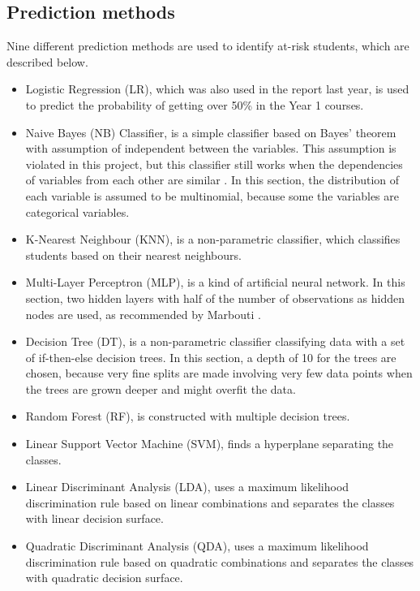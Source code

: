 \documentclass[a4paper]{report}
\begin{document}
\subsection{Prediction methods}

Nine different prediction methods are used to identify at-risk students, which are described below. 

\begin{itemize}
\item Logistic Regression (LR), which was also used in the report last year, is used to predict the probability of getting over 50\% in the Year 1 courses. 
\item Naive Bayes (NB) Classifier, is a simple classifier based on Bayes' theorem with assumption of independent between the variables. This assumption is violated in this project, but this classifier still works when the dependencies of variables from each other are similar \cite{NBassump}. In this section, the distribution of each variable is assumed to be multinomial, because some the variables are categorical variables. 
\item K-Nearest Neighbour (KNN), is a non-parametric classifier, which classifies students based on their nearest neighbours. 
\item Multi-Layer Perceptron (MLP), is a kind of artificial neural network. In this section, two hidden layers with half of the number of observations as hidden nodes are used, as recommended by Marbouti \cite{ml}. 
\item Decision Tree (DT), is a non-parametric classifier classifying data with a set of if-then-else decision trees. In this section, a depth of 10 for the trees are chosen, because very fine splits are made involving very few data points when the trees are grown deeper and might overfit the data. 
\item Random Forest (RF), is constructed with multiple decision trees. 
\item Linear Support Vector Machine (SVM), finds a hyperplane separating the classes. 
\item Linear Discriminant Analysis (LDA), uses a maximum likelihood discrimination rule based on linear combinations and separates the classes with linear decision surface. 
\item Quadratic Discriminant Analysis (QDA), uses a maximum likelihood discrimination rule based on quadratic combinations and separates the classes with quadratic decision surface. 
\end{itemize}
\end{document}
